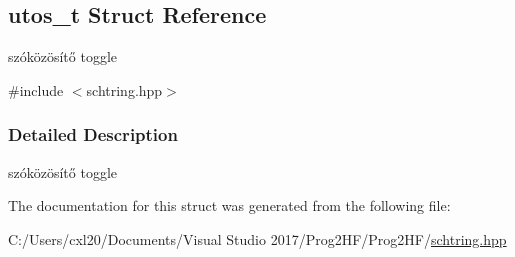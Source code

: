 \hypertarget{structutos__t}{}\subsection{utos\+\_\+t Struct Reference}
\label{structutos__t}


szóközösítő toggle  




{\ttfamily \#include $<$schtring.\+hpp$>$}



\subsubsection{Detailed Description}
szóközösítő toggle 

The documentation for this struct was generated from the following file\+:\begin{DoxyCompactItemize}
\item 
C\+:/\+Users/cxl20/\+Documents/\+Visual Studio 2017/\+Prog2\+H\+F/\+Prog2\+H\+F/\mbox{\hyperlink{schtring_8hpp}{schtring.\+hpp}}\end{DoxyCompactItemize}
